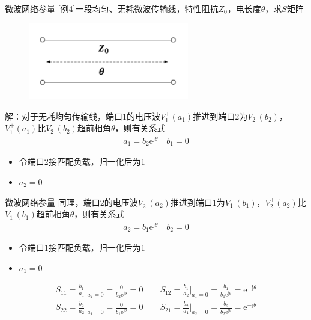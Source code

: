 \begin{frame}{微波网络参量}
    [例4]\quad 一段均匀、无耗微波传输线，特性阻抗$Z_0$，电长度$\theta$，求$S$矩阵
    \begin{figure}
        \includegraphics[width=7cm]{Cha5//fig5-17.pdf}
    \end{figure}
    解：对于无耗均匀传输线，端口1的电压波$V_1^+(a_1)$推进到端口2为$V_2^-(b_2)$，$V_1^+(a_1)$比$V_2^-(b_2)$超前相角$\theta$，则有关系式
    \begin{align*}
        a_1=b_2\mathrm{e}^{\mathrm{j}\theta}\quad b_1=0
    \end{align*}
    \begin{itemize}
        \item 令端口2接匹配负载，归一化后为1
        \item $a_2=0$
    \end{itemize}
\end{frame}

\begin{frame}{微波网络参量}
    同理，端口2的电压波$V_2^+(a_2)$推进到端口1为$V_1^-(b_1)$，$V_2^+(a_2)$比$V_1^-(b_1)$超前相角$\theta$，则有关系式
    \begin{align*}
        a_2=b_1\mathrm{e}^{\mathrm{j}\theta}\quad b_2=0
    \end{align*}
    \begin{itemize}
        \item 令端口1接匹配负载，归一化后为1
        \item $a_1=0$
    \end{itemize}
    \begin{align*}
        S_{11}=\frac{b_1}{a_1}\bigg|_{a_2=0}=\frac{0}{b_2\mathrm{e}^{\mathrm{j}\theta}}=0\qquad
        S_{12}=\frac{b_1}{a_2}\bigg|_{a_1=0}=\frac{b_1}{b_1\mathrm{e}^{\mathrm{j}\theta}}=\mathrm{e}^{-\mathrm{j}\theta}\\
        S_{22}=\frac{b_2}{a_2}\bigg|_{a_1=0}=\frac{0}{b_1\mathrm{e}^{\mathrm{j}\theta}}=0\qquad
        S_{21}=\frac{b_2}{a_1}\bigg|_{a_2=0}=\frac{b_2}{b_2\mathrm{e}^{\mathrm{j}\theta}}=\mathrm{e}^{-\mathrm{j}\theta}
    \end{align*}
\end{frame}

